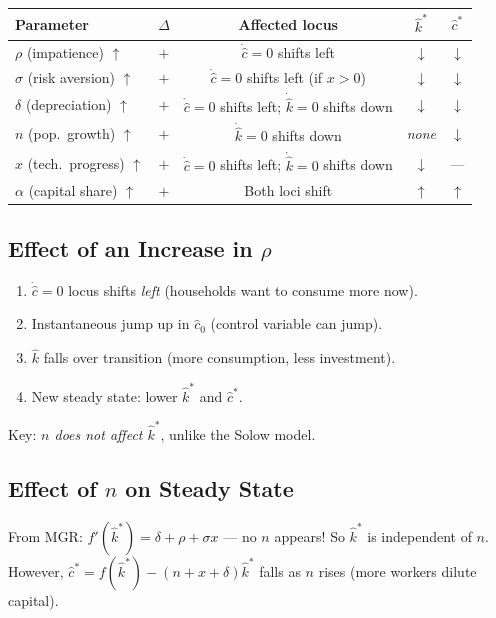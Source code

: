 \documentclass[a4paper,11pt]{article}
\newcommand{\khat}{\hat{k}}
\newcommand{\chat}{\hat{c}}
\begin{document}
\begin{center}
\begin{tabular}{lcccc}
\toprule
\textbf{Parameter} & $\Delta$ & \textbf{Affected locus} & $\khat^*$ & $\chat^*$ \\
\midrule
$\rho$ (impatience) $\uparrow$ & $+$ & $\dot{\chat}=0$ shifts left & $\downarrow$ & $\downarrow$ \\
$\sigma$ (risk aversion) $\uparrow$ & $+$ & $\dot{\chat}=0$ shifts left (if $x>0$) & $\downarrow$ & $\downarrow$ \\
$\delta$ (depreciation) $\uparrow$ & $+$ & $\dot{\chat}=0$ shifts left; $\dot{\khat}=0$ shifts down & $\downarrow$ & $\downarrow$ \\
$n$ (pop.\ growth) $\uparrow$ & $+$ & $\dot{\khat}=0$ shifts down & \emph{none} & $\downarrow$ \\
$x$ (tech.\ progress) $\uparrow$ & $+$ & $\dot{\chat}=0$ shifts left; $\dot{\khat}=0$ shifts down & $\downarrow$ & --- \\
$\alpha$ (capital share) $\uparrow$ & $+$ & Both loci shift & $\uparrow$ & $\uparrow$ \\
\bottomrule
\end{tabular}
\end{center}

\subsection*{Effect of an Increase in $\rho$}
\begin{enumerate}[leftmargin=*]
  \item $\dot{\chat}=0$ locus shifts \emph{left} (households want to consume more now).
  \item Instantaneous jump up in $\chat_0$ (control variable can jump).
  \item $\khat$ falls over transition (more consumption, less investment).
  \item New steady state: lower $\khat^*$ and $\chat^*$.
\end{enumerate}
Key: \emph{$n$ does not affect $\khat^*$}, unlike the Solow model.

\subsection*{Effect of $n$ on Steady State}
From MGR: $f'(\khat^*) = \delta + \rho + \sigma x$ --- no $n$ appears! So $\khat^*$ is independent of $n$. However, $\chat^* = f(\khat^*) - (n+x+\delta)\khat^*$ falls as $n$ rises (more workers dilute capital).
\end{document}
